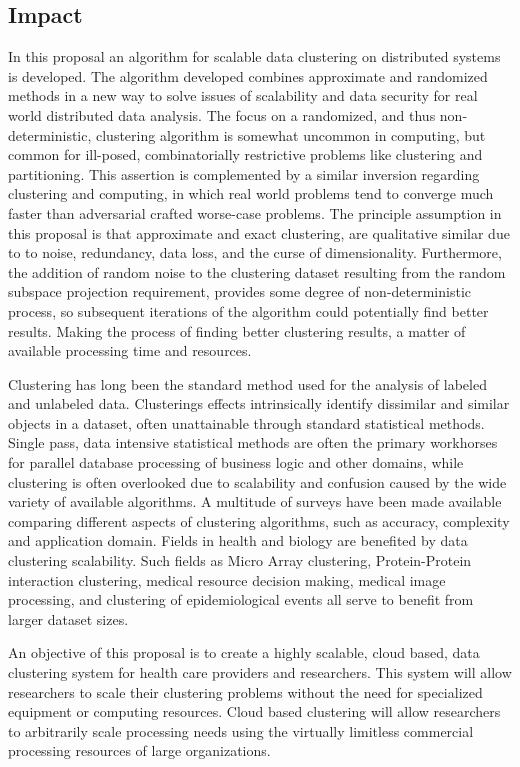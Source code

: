 \documentclass[a4paper,10pt]{article}
\begin{document}
\subsection{Impact}

In this proposal an algorithm for scalable data clustering on distributed
systems is developed.  The algorithm developed combines approximate and
randomized methods in a new way to solve issues of scalability and data
security for real world distributed data analysis.  The focus on a randomized,
and thus non-deterministic, clustering algorithm is somewhat uncommon in
computing, but common for ill-posed, combinatorially restrictive problems
like clustering and partitioning.  This assertion is complemented by a
similar inversion regarding clustering and computing, in which real world
problems tend to converge much faster than adversarial crafted worse-case
problems\cite{Mahajan09}.  The principle assumption in this proposal is that
approximate and exact clustering, are qualitative similar due to to noise,
redundancy, data loss, and the curse of dimensionality.  Furthermore, the
addition of random noise to the clustering dataset resulting from the random
subspace projection requirement, provides some degree of non-deterministic
process, so subsequent iterations of the algorithm could potentially find
better results.  Making the process of finding better clustering results,
a matter of available processing time and resources.

Clustering has long been the standard method used for the analysis of
labeled and unlabeled data.  Clusterings effects intrinsically identify
dissimilar and similar objects in a dataset, often unattainable through
standard statistical methods.  Single pass, data intensive statistical
methods are often the primary workhorses for parallel database processing
of business logic and other domains, while clustering is often overlooked
due to scalability and confusion caused by the wide variety of available
algorithms\cite{clusters}.  A multitude of surveys\cite{clusters} have
been made available comparing different aspects of clustering algorithms,
such as accuracy, complexity and application domain.  Fields in health and
biology are benefited by data clustering scalability.  Such fields as Micro
Array clustering, Protein-Protein interaction clustering, medical resource
decision making, medical image processing,  and clustering of epidemiological
events all serve to benefit from larger dataset sizes.

An objective of this proposal is to create a highly scalable, cloud based,
data clustering system for health care providers and researchers.  This system
will allow researchers to scale their clustering problems without the need
for  specialized equipment or computing resources.  Cloud based clustering
will allow researchers to arbitrarily scale processing needs using the
virtually limitless commercial processing resources of large organizations.
\end{document}
